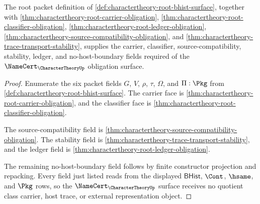 \begin{theorem}
\label{thm:charactertheory-namecert-obligation-surface}
The root packet definition of \autoref{def:charactertheory-root-bhist-surface}, together with \autoref{thm:charactertheory-root-carrier-obligation}, \autoref{thm:charactertheory-root-classifier-obligation}, \autoref{thm:charactertheory-root-ledger-obligation}, \autoref{thm:charactertheory-source-compatibility-obligation}, and \autoref{thm:charactertheory-trace-transport-stability}, supplies the carrier, classifier, source-compatibility, stability, ledger, and no-host-boundary fields required of the $\NameCert_{\CharacterTheoryUp}$ obligation surface.
\end{theorem}
\begin{proof}
Enumerate the six packet fields $G$, $V$, $\rho$, $\tau$, $\Omega$, and $\Pi:\Pkg$ from \autoref{def:charactertheory-root-bhist-surface}. The carrier face is \autoref{thm:charactertheory-root-carrier-obligation}, and the classifier face is \autoref{thm:charactertheory-root-classifier-obligation}.

The source-compatibility field is \autoref{thm:charactertheory-source-compatibility-obligation}. The stability field is \autoref{thm:charactertheory-trace-transport-stability}, and the ledger field is \autoref{thm:charactertheory-root-ledger-obligation}.

The remaining no-host-boundary field follows by finite constructor projection and repacking. Every field just listed reads from the displayed $\mathsf{BHist}$, $\Cont$, $\hsame$, and $\Pkg$ rows, so the $\NameCert_{\CharacterTheoryUp}$ surface receives no quotient class carrier, host trace, or external representation object.
\end{proof}

